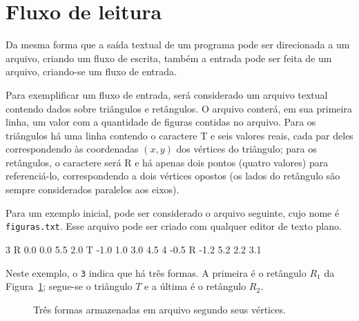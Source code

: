 \documentclass[
  11pt,
  a4paper,
]{scrbook}
\newenvironment{Shaded}{\begin{snugshade}}{\end{snugshade}}
\newcommand{\NormalTok}[1]{#1}
\begin{document}
\section{Fluxo de leitura}\label{sec-fluxo-de-leitura}

Da mesma forma que a saída textual de um programa pode ser direcionada a
um arquivo, criando um fluxo de escrita, também a entrada pode ser feita
de um arquivo, criando-se um fluxo de entrada.

Para exemplificar um fluxo de entrada, será considerado um arquivo
textual contendo dados sobre triângulos e retângulos. O arquivo conterá,
em sua primeira linha, um valor com a quantidade de figuras contidas no
arquivo. Para os triângulos há uma linha contendo o caractere T e seis
valores reais, cada par deles correspondendo às coordenadas \((x, y)\)
dos vértices do triângulo; para os retângulos, o caractere será R e há
apenas dois pontos (quatro valores) para referenciá-lo, correspondendo a
dois vértices opostos (os lados do retângulo são sempre considerados
paralelos aos eixos).

Para um exemplo inicial, pode ser considerado o arquivo seguinte, cujo
nome é \texttt{figuras.txt}. Esse arquivo pode ser criado com qualquer
editor de texto plano.

\begin{Shaded}
\begin{Highlighting}[]
\NormalTok{3}
\NormalTok{R 0.0 0.0 5.5 2.0}
\NormalTok{T {-}1.0 1.0 3.0 4.5 4 {-}0.5}
\NormalTok{R {-}1.2 5.2 2.2 3.1}
\end{Highlighting}
\end{Shaded}

Neste exemplo, o \texttt{3} indica que há três formas. A primeira é o
retângulo \(R_1\) da Figura~\ref{fig-retangulos-e-triangulos}; segue-se
o triângulo \(T\) e a última é o retângulo \(R_2\).

\begin{figure}[tb]

\caption{\label{fig-retangulos-e-triangulos}Três formas armazenadas em
arquivo segundo seus vértices.}


\end{figure}%
\end{document}

